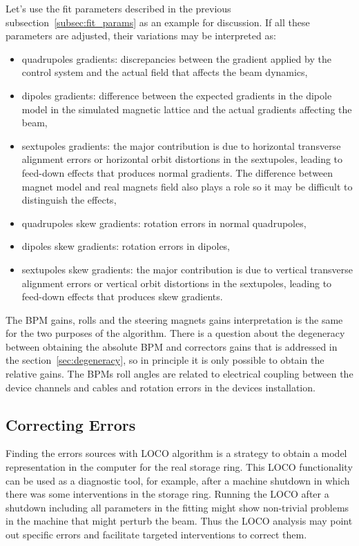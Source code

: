Let's use the fit parameters described in the previous subsection~\ref{subsec:fit_params} as an example for discussion. If all these parameters are adjusted, their variations may be interpreted as:
\begin{itemize}
    \item quadrupoles gradients: discrepancies between the gradient applied by the control system and the actual field that affects the beam dynamics,
    \item dipoles gradients: difference between the expected gradients in the dipole model in the simulated magnetic lattice and the actual gradients affecting the beam,
    \item sextupoles gradients: the major contribution is due to horizontal transverse alignment errors or horizontal orbit distortions in the sextupoles, leading to feed-down effects that produces normal gradients. The difference between magnet model and real magnets field also plays a role so it may be difficult to distinguish the effects, 
    \item quadrupoles skew gradients: rotation errors in normal quadrupoles,
    \item dipoles skew gradients: rotation errors in dipoles,
    \item sextupoles skew gradients: the major contribution is due to vertical transverse alignment errors or vertical orbit distortions in the sextupoles, leading to feed-down effects that produces skew gradients. 
    \end{itemize}
The BPM gains, rolls and the steering magnets gains interpretation is the same for the two purposes of the algorithm. There is a question about the degeneracy between obtaining the absolute BPM and correctors gains that is addressed in the section~\ref{sec:degeneracy}, so in principle it is only possible to obtain the relative gains. The BPMs roll angles are related to electrical coupling between the device channels and cables and rotation errors in the devices installation.
\subsection{Correcting Errors}
Finding the errors sources with LOCO algorithm is a strategy to obtain a model representation in the computer for the real storage ring. This LOCO functionality can be used as a diagnostic tool, for example, after a machine shutdown in which there was some interventions in the storage ring. Running the LOCO after a shutdown including all parameters in the fitting might show non-trivial problems in the machine that might perturb the beam. Thus the LOCO analysis may point out specific errors and facilitate targeted interventions to correct them.

